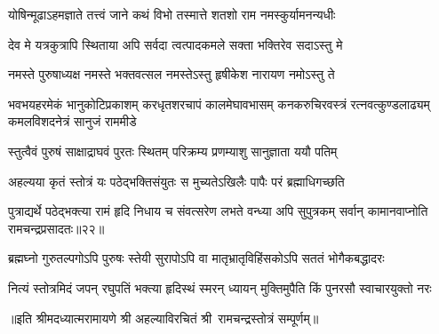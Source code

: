 \twolineshloka
{योषिन्मूढाऽहमज्ञाते तत्त्वं जाने कथं विभो}
{तस्मात्ते शतशो राम नमस्कुर्यामनन्यधीः}%

\twolineshloka
{देव मे यत्रकुत्रापि स्थिताया अपि सर्वदा}
{त्वत्पादकमले सक्ता भक्तिरेव  सदाऽस्तु मे}%

\twolineshloka
{नमस्ते पुरुषाध्यक्ष नमस्ते भक्तवत्सल}
{नमस्तेऽस्तु हृषीकेश नारायण नमोऽस्तु ते}%

\fourlineindentedshloka
{भवभयहरमेकं भानुकोटिप्रकाशम्}
{करधृतशरचापं कालमेघावभासम्}
{कनकरुचिरवस्त्रं रत्नवत्कुण्डलाढ्यम्}
{कमलविशदनेत्रं सानुजं राममीडे}%

\twolineshloka
{स्तुत्वैवं पुरुषं साक्षाद्राघवं पुरतः स्थितम्}
{परिक्रम्य प्रणम्याशु सानुज्ञाता ययौ पतिम्}%

\twolineshloka
{अहल्यया कृतं स्तोत्रं यः पठेद्भक्तिसंयुतः}
{स मुच्यतेऽखिलैः पापैः परं ब्रह्माधिगच्छति}%

\twolineshloka
{पुत्राद्यर्थे पठेद्भक्त्या रामं हृदि निधाय च}
{संवत्सरेण लभते वन्ध्या अपि सुपुत्रकम्}%
{सर्वान् कामानवाप्नोति रामचन्द्रप्रसादतः॥२२॥}%

\twolineshloka
{ब्रह्मघ्नो गुरुतल्पगोऽपि पुरुषः स्तेयी सुरापोऽपि वा}
{मातृभ्रातृविहिंसकोऽपि सततं भोगैकबद्धादरः}

\twolineshloka
{नित्यं स्तोत्रमिदं जपन्  रघुपतिं भक्त्या हृदिस्थं स्मरन्}
{ध्यायन् मुक्तिमुपैति किं पुनरसौ स्वाचारयुक्तो नरः}%

॥इति श्रीमदध्यात्मरामायणे श्री अहल्याविरचितं श्री~रामचन्द्रस्तोत्रं सम्पूर्णम्॥